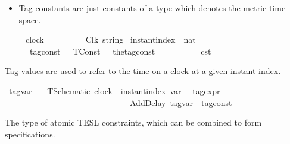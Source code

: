 \begin{isabellebody}
\begin{isamarkuptext}
\begin{itemize}
\item Tag constants are just constants of a type which denotes the metric time space.%
\end{itemize}%
\end{isamarkuptext}\isamarkuptrue%
\isamarkupfalse%
\ \ \ \ \ clock\ \ \ \ \ \ \ \ \ {\isacharequal}\ Clk\ {\isacartoucheopen}string{\isacartoucheclose}\isanewline
{}\isamarkupfalse%
\ instant{\isacharunderscore}index\ {\isacharequal}\ {\isacartoucheopen}nat{\isacartoucheclose}\isanewline
\isanewline
{}\isamarkupfalse%
\ \ \ \ \ {\isacharprime}{\isasymtau}\ tag{\isacharunderscore}const\ {\isacharequal}\ \ TConst\ \ \ {\isacharparenleft}the{\isacharunderscore}tag{\isacharunderscore}const\ {\isacharcolon}\ {\isacharprime}{\isasymtau}{\isacharparenright}\ \ \ \ \ \ \ \ \ {\isacharparenleft}{\isacartoucheopen}{\isasymtau}\isactrlsub c\isactrlsub s\isactrlsub t{\isacartoucheclose}{\isacharparenright}%
\begin{isamarkuptext}%
Tag values are used to refer to the time on a clock at a given instant index.%
\end{isamarkuptext}\isamarkuptrue%
\isamarkupfalse%
\ tag{\isacharunderscore}var\ {\isacharequal}\isanewline
\ \ TSchematic\ {\isacartoucheopen}clock\ {\isacharasterisk}\ instant{\isacharunderscore}index{\isacartoucheclose}\ {\isacharparenleft}{\isacartoucheopen}{\isasymtau}\isactrlsub v\isactrlsub a\isactrlsub r{\isacartoucheclose}{\isacharparenright}\isanewline
{}\isamarkupfalse%
\ {\isacharprime}{\isasymtau}\ tag{\isacharunderscore}expr\ \ \ \ \ \ {\isacharequal}\ \ \isanewline
\ \ \ \ \ \ \ \ \ \ \ \ \ \ \ \ \ \ \ \ \ \ \ \ \ \ \ \ \ \ AddDelay\ {\isacartoucheopen}tag{\isacharunderscore}var{\isacartoucheclose}\ {\isacartoucheopen}{\isacharprime}{\isasymtau}\ tag{\isacharunderscore}const{\isacartoucheclose}\ {\isacharparenleft}{\isacartoucheopen}{\isasymlparr}\ {\isacharunderscore}\ {\isasymoplus}\ {\isacharunderscore}\ {\isasymrparr}{\isacartoucheclose}{\isacharparenright}%
\isadelimdocument
%
\endisadelimdocument
%
\isatagdocument
%
\isamarkuptrue%
%
\endisatagdocument
{\isafolddocument}%
%
\isadelimdocument
%
\endisadelimdocument
%
\begin{isamarkuptext}%
The type of atomic TESL constraints, which can be combined to form specifications.%
\end{isamarkuptext}\isamarkuptrue%
\isamarkupfalse%

\end{isabellebody}
